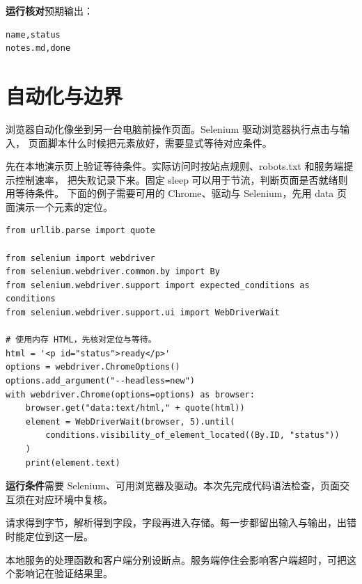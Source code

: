 \textbf{运行核对}\enspace 预期输出：
\begin{lstlisting}[language={},numbers=none]
name,status
notes.md,done
\end{lstlisting}

\par


\section{自动化与边界}

浏览器自动化像坐到另一台电脑前操作页面。Selenium 驱动浏览器执行点击与输入，
页面脚本什么时候把元素放好，需要显式等待对应条件。

先在本地演示页上验证等待条件。实际访问时按站点规则、robots.txt 和服务端提示控制速率，
把失败记录下来。固定 sleep 可以用于节流，判断页面是否就绪则用等待条件。
下面的例子需要可用的 Chrome、驱动与 Selenium，先用 data 页面演示一个元素的定位。


\begin{lstlisting}[title={\code{browser_demo.py}}]
from urllib.parse import quote

from selenium import webdriver
from selenium.webdriver.common.by import By
from selenium.webdriver.support import expected_conditions as conditions
from selenium.webdriver.support.ui import WebDriverWait

# 使用内存 HTML，先核对定位与等待。
html = '<p id="status">ready</p>'
options = webdriver.ChromeOptions()
options.add_argument("--headless=new")
with webdriver.Chrome(options=options) as browser:
    browser.get("data:text/html," + quote(html))
    element = WebDriverWait(browser, 5).until(
        conditions.visibility_of_element_located((By.ID, "status"))
    )
    print(element.text)
\end{lstlisting}


\textbf{运行条件}\enspace 需要 Selenium、可用浏览器及驱动。本次先完成代码语法检查，页面交互须在对应环境中复核。

\begin{myunderstanding}
请求得到字节，解析得到字段，字段再进入存储。每一步都留出输入与输出，出错时能定位到这一层。
\end{myunderstanding}

\begin{pycharmpractice}
本地服务的处理函数和客户端分别设断点。服务端停住会影响客户端超时，可把这个影响记在验证结果里。
\end{pycharmpractice}

